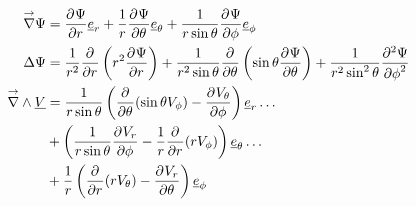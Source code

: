 \begin{align*}
\vgrad \Psi &= \ddr{r}{\Psi} \v e_r + \frac{1}{r}\ddr{\theta}{\Psi}\v e_\theta + \frac{1}{r\sin\theta}\ddr{\phi}{\Psi} \v e_\phi\\
 \Delta \Psi & = \frac{1}{r^2}\ddr{r}{}\left(r^2\ddr{r}{\Psi}\right)
+ \frac{1}{r^2\sin\theta}\ddr{\theta}{}\left(\sin\theta\ddr{\theta}{\Psi}\right)
+ \frac{1}{r^2\sin^2\theta}\ddr[2]{\phi}{\Psi} \\
\vrot \v V &= \frac{1}{r\sin\theta}\left(\ddr{\theta}{}(\sin\theta V_\phi)-\ddr{\phi}{V_\theta}\right)\v e_r \dots\\
&+ \left(\frac{1}{r\sin\theta}\ddr{\phi}{V_r} - \frac{1}{r}\ddr{r}{}(rV_\phi)\right) \v e_\theta \dots \\
&+ \frac{1}{r}\left( \ddr{r}{}(rV_\theta) - \ddr{\theta}{V_r}\right)\v e_\phi
\end{align*}


